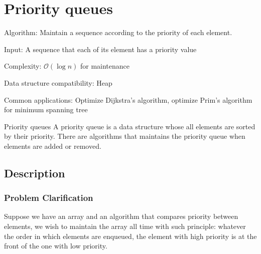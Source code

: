 \documentclass[catalog.tex]{subfiles}
\begin{document}
\def\pbname{Priority queues} %

\section{\pbname} 

\begin{overview}
\item [Algorithm:] Maintain a sequence according to the priority of each element. 
\item [Input:] A sequence that each of its element has a priority value
\item [Complexity:] $\mathcal{O}(\log n)$ for maintenance
\item [Data structure compatibility:] Heap
\item [Common applications:] Optimize Dijkstra's algorithm, optimize Prim's algorithm for minimum spanning tree
\end{overview}


\begin{problem}{\pbname}
	A priority queue is a data structure whose all elements are sorted by their priority. There are algorithms that maintains the priority queue when elements are added or removed.
\end{problem}

\subsection*{Description}
\subsubsection{Problem Clarification}
Suppose we have an array and an algorithm that compares priority between elements, we wish to maintain the array all time with such principle: whatever the order in which elements are enqueued, the element with high priority is at the front of the one with low priority.
\end{document}
